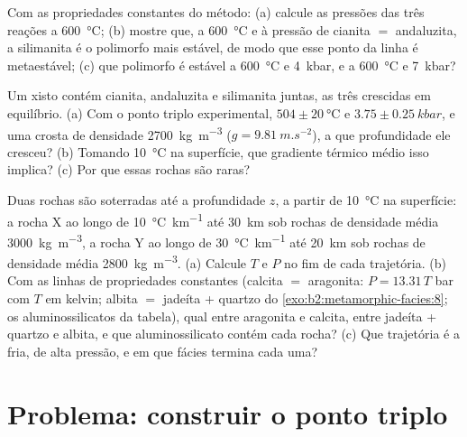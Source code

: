 \begin{exercise}[$\star\star\star$]\label{exo:b2:metamorphic-facies:10}
Com as propriedades constantes do método: (a) calcule as pressões das três
reações a \qty{600}{\celsius}; (b) mostre que, a \qty{600}{\celsius} e à pressão de
cianita $=$ andaluzita, a silimanita é o polimorfo mais estável, de modo que esse ponto da
linha é metaestável; (c) que polimorfo é estável a \qty{600}{\celsius} e
\qty{4}{kbar}, e a \qty{600}{\celsius} e \qty{7}{kbar}?
\end{exercise}

\begin{exercise}[$\star\star\star$]\label{exo:b2:metamorphic-facies:11}
Um xisto contém cianita, andaluzita e silimanita juntas, as três crescidas em
equilíbrio. (a) Com o ponto triplo experimental, $504 \pm \qty{20}{\celsius}$ e
$3.75 \pm \qty{0.25}{kbar}$, e uma crosta de densidade \qty{2700}{kg.m^{-3}} ($g =
\qty{9.81}{m.s^{-2}}$), a que profundidade ele cresceu? (b) Tomando \qty{10}{\celsius} na
superfície, que gradiente térmico médio isso implica? (c) Por que essas rochas são raras?
\end{exercise}

\begin{exercise}[$\star\star\star$]\label{exo:b2:metamorphic-facies:12}
Duas rochas são soterradas até a profundidade $z$, a partir de \qty{10}{\celsius} na superfície: a rocha X ao longo de
\qty{10}{\celsius.km^{-1}} até \qty{30}{km} sob rochas de densidade média
\qty{3000}{kg.m^{-3}}, a rocha Y ao longo de \qty{30}{\celsius.km^{-1}} até \qty{20}{km} sob rochas
de densidade média \qty{2800}{kg.m^{-3}}. (a) Calcule $T$ e $P$ no fim de cada trajetória.
(b) Com as linhas de propriedades constantes (calcita $=$ aragonita: $P = 13.31\,T$ bar com $T$
em kelvin; albita $=$ jadeíta + quartzo do \cref{exo:b2:metamorphic-facies:8}; os aluminossilicatos da
tabela), qual entre aragonita e calcita, entre jadeíta + quartzo e albita, e que
aluminossilicato contém cada rocha? (c) Que trajetória é a fria, de alta pressão, e em que fácies termina cada uma?
\end{exercise}

\section{Problema: construir o ponto triplo}

